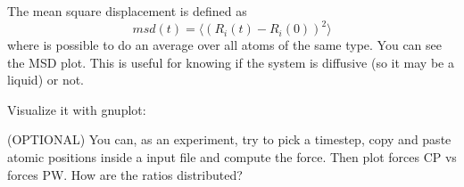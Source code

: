 \documentclass[landscape]{foils}
\begin{document}
The mean square displacement is defined as
\begin{equation}
msd(t) = \langle(R_i(t)-R_i(0))^2\rangle
\end{equation}
where is possible to do an average over all atoms of the same type.
You can see the MSD plot. This is useful for knowing if the system is diffusive (so it may be a liquid) or not.

Visualize it with gnuplot:


(OPTIONAL) You can, as an experiment, try to pick a timestep, copy and paste atomic positions inside a  input file and compute the force. Then plot forces CP vs forces PW. How are the ratios distributed?
\end{document}
